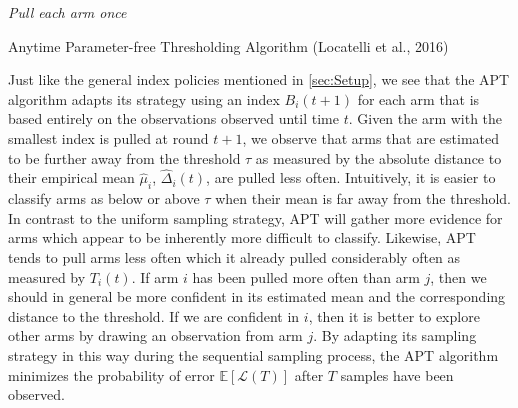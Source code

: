 \documentclass[11pt,]{article}
\begin{document}
\begin{algorithm}
\Input{$\tau$, $\epsilon$}
\BlankLine
\emph{Pull each arm once}\;
\caption{Anytime Parameter-free Thresholding Algorithm (Locatelli et al., 2016)}\label{alg:APT}
\end{algorithm}

\DecMargin{1em}

Just like the general index policies mentioned in \autoref{sec:Setup},
we see that the APT algorithm adapts its strategy using an index
\(B_i(t+1)\) for each arm that is based entirely on the observations
observed until time \(t\). Given the arm with the smallest index is
pulled at round \(t+1\), we observe that arms that are estimated to be
further away from the threshold \(\tau\) as measured by the absolute
distance to their empirical mean \(\hat{\mu}_i\), \(\hat{\Delta}_i(t)\),
are pulled less often. Intuitively, it is easier to classify arms as
below or above \(\tau\) when their mean is far away from the threshold.
In contrast to the uniform sampling strategy, APT will gather more
evidence for arms which appear to be inherently more difficult to
classify. Likewise, APT tends to pull arms less often which it already
pulled considerably often as measured by \(T_i(t)\). If arm \(i\) has
been pulled more often than arm \(j\), then we should in general be more
confident in its estimated mean and the corresponding distance to the
threshold. If we are confident in \(i\), then it is better to explore
other arms by drawing an observation from arm \(j\). By adapting its
sampling strategy in this way during the sequential sampling process,
the APT algorithm minimizes the probability of error
\(\mathbb{E}[\mathcal{L}(T)]\) after \(T\) samples have been observed.
\end{document}

